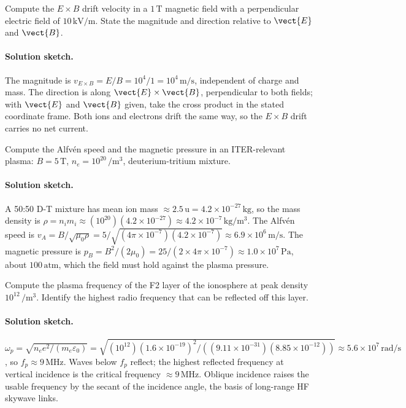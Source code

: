 \begin{exercise}
Compute the $E\times B$ drift velocity in a $1\,\si{\tesla}$
magnetic field with a perpendicular electric field of $10\,\si{\kilo
\volt\per\meter}$. State the magnitude and direction relative to
$\vect{E}$ and $\vect{B}$.
\paragraph{Solution sketch.} The magnitude is $v_{E\times B} = E/B =
10^{4}/1 = 10^{4}\,\si{\meter\per\second}$, independent of charge and
mass. The direction is along $\vect{E}\times\vect{B}$, perpendicular to
both fields; with $\vect{E}$ and $\vect{B}$ given, take the cross product
in the stated coordinate frame. Both ions and electrons drift the same
way, so the $E\times B$ drift carries no net current.
\end{exercise}

\begin{exercise}
Compute the Alfv\'en speed and the magnetic pressure in an
ITER-relevant plasma: $B = 5\,\si{\tesla}$, $n_{e} = 10^{20}\,\si{\per
\meter\cubed}$, deuterium-tritium mixture.
\paragraph{Solution sketch.} A 50:50 D-T mixture has mean ion mass
$\approx 2.5\,\text{u} = 4.2\times 10^{-27}\,\si{\kilogram}$, so the mass
density is $\rho = n_{i}m_{i} \approx (10^{20})(4.2\times 10^{-27})
\approx 4.2\times 10^{-7}\,\si{\kilogram\per\cubic\meter}$. The Alfv\'en
speed is $v_{A} = B/\sqrt{\mu_{0}\rho} = 5/\sqrt{(4\pi\times 10^{-7})
(4.2\times 10^{-7})} \approx 6.9\times 10^{6}\,\si{\meter\per\second}$.
The magnetic pressure is $p_{B} = B^{2}/(2\mu_{0}) = 25/(2\times
4\pi\times 10^{-7}) \approx 1.0\times 10^{7}\,\si{\pascal}$, about
$100\,\text{atm}$, which the field must hold against the plasma pressure.
\end{exercise}

\begin{exercise}
Compute the plasma frequency of the F2 layer of the ionosphere at
peak density $10^{12}\,\si{\per\meter\cubed}$. Identify the highest
radio frequency that can be reflected off this layer.
\paragraph{Solution sketch.} $\omega_{p} = \sqrt{n_{e}e^{2}/(m_{e}
\varepsilon_{0})} = \sqrt{(10^{12})(1.6\times 10^{-19})^{2}/((9.11\times
10^{-31})(8.85\times 10^{-12}))} \approx 5.6\times 10^{7}\,\si{\radian
\per\second}$, so $f_{p}\approx 9\,\si{\mega\hertz}$. Waves below $f_{p}$
reflect; the highest reflected frequency at vertical incidence is the
critical frequency $\approx 9\,\si{\mega\hertz}$. Oblique incidence
raises the usable frequency by the secant of the incidence angle, the
basis of long-range HF skywave links.
\end{exercise}

